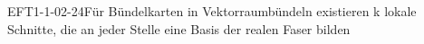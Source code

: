 
\begin{REM}{EFT1-1-02-24}{Für Bündelkarten in Vektorraumbündeln existieren k lokale Schnitte, die an jeder Stelle eine Basis der realen Faser bilden}
\end{REM}
